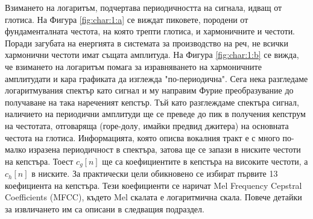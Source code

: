 \documentclass[main.tex]{subfiles}
\begin{document}
    Взимането на логаритъм, подчертава периодичността на сигнала, идващ от глотиса. На Фигура \autoref{fig:char:1:a} се виждат пиковете, породени от
    фундаменталната честота, на която трепти глотиса, и хармоничните и честоти. Поради загубата на енергията в системата за производство на реч, не всички хармонични честоти имат същата амплитуда.
    На Фигура \autoref{fig:char:1:b} се вижда, че взимането на логаритъм помага за изравняването на хармоничните амплитудати и кара графиката да изглежда "по-периодична". 
    Сега нека разгледаме логаритмувания спектър като сигнал и му направим Фурие преобразувание до получаване на така нареченият кепстър.
    Тъй като разглеждаме спектъра сигнал, наличието на периодични амплитуди ще се преведе до пик в получения кепструм на честотата, отговаряща (горе-долу, имайки предвид джитера) на основната честота на глотиса. Информацията, която описва вокалния тракт е с много по-малко изразена периодичност в спектъра, затова ще се запази в ниските честоти на кепстъра. Тоест $c_g[n]$  ще са коефициентите в кепстъра на високите честоти, а $c_h[n]$ в ниските. За практически цели обикновено се избират първите 13 коефициента на кепстъра. Тези коефициенти се наричат Mel Frequency Cepstral Coefficients (MFCC), където Mel скалата е логаритмична скала. Повече детайки за извличането им са описани в следващия подраздел.
\end{document}
